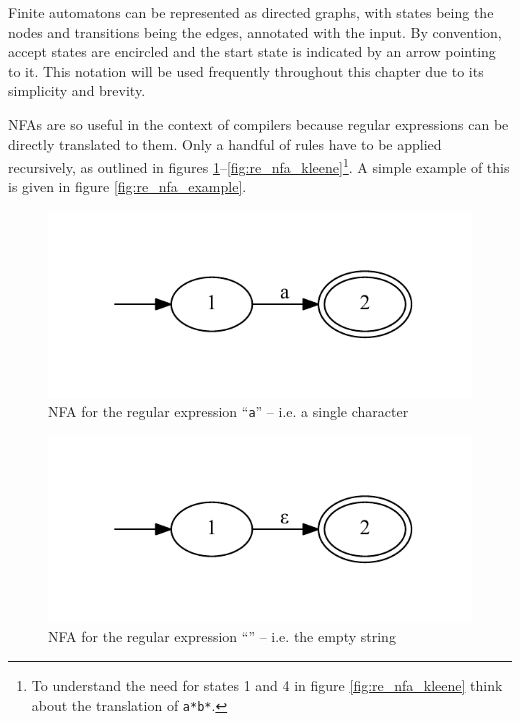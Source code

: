 			Finite automatons can be represented as directed graphs, with states being the nodes and transitions being the edges, annotated with the input. By convention, accept states are encircled and the start state is indicated by an arrow pointing to it. This notation will be used frequently throughout this chapter due to its simplicity and brevity.
			
			NFAs are so useful in the context of compilers because regular expressions can be directly translated to them. Only a handful of rules have to be applied recursively, as outlined in figures \ref{fig:re_nfa_char}--\ref{fig:re_nfa_kleene}\footnote{To understand the need for states 1 and 4 in figure \ref{fig:re_nfa_kleene} think about the translation of \lstinline$a*b*$.}. A simple example of this is given in figure \ref{fig:re_nfa_example}.
			
			
			\begin{figure}
			\centering
			\includegraphics{figures/re_char}
			\caption{NFA for the regular expression ``\lstinline$a$'' -- i.e. a single character}
			\label{fig:re_nfa_char}
			\end{figure}
			
			\begin{figure}
			\centering
			\includegraphics{figures/re_epsilon}
			\caption{NFA for the regular expression ``'' -- i.e. the empty string}
			\label{fig:re_nfa_epsilon}
			\end{figure}
			
